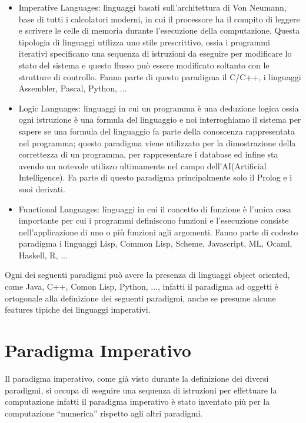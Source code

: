 \documentclass[a4paper]{report}
\begin{document}
\begin{itemize}
\item Imperative Languages: linguaggi basati sull'architettura di Von Neumann, base di tutti i calcolatori moderni,
      in cui il processore ha il compito di leggere e scrivere le celle di memoria durante l'esecuzione della computazione.\newline
      Questa tipologia di linguaggi utilizza uno stile prescrittivo, ossia i programmi iterativi specificano una sequenza
      di istruzioni da eseguire per modificare lo stato del sistema e questo flusso può essere modificato soltanto con
      le strutture di controllo.
      Fanno parte di questo paradigma il C/C++, i linguaggi Assembler, Pascal, Python, ...
\item Logic Languages: linguaggi in cui un programma è una deduzione logica ossia ogni istruzione è una formula del linguaggio
      e noi interroghiamo il sistema per sapere se una formula del linguaggio fa parte della conoscenza rappresentata nel programma;
      questo paradigma viene utilizzato per la dimostrazione della correttezza di un programma, per rappresentare i database
      ed infine sta avendo un notevole utilizzo ultimamente nel campo dell'AI(Artificial Intelligence).
      Fa parte di questo paradigma principalmente solo il Prolog e i suoi derivati.
\item Functional Languages: linguaggi in cui il concetto di funzione è l'unica cosa importante per cui i programmi definiscono
      funzioni e l'esecuzione consiste nell'applicazione di uno o più funzioni agli argomenti.
      Fanno parte di codesto paradigma i linguaggi Lisp, Common Lisp, Scheme, Javascript, ML, Ocaml, Haskell, R, ...
\end{itemize}
Ogni dei seguenti paradigmi può avere la presenza di linguaggi object oriented, come Java, C++, Comon Lisp, Python, ...,
infatti il paradigma ad oggetti è ortogonale alla definizione dei seguenti paradigmi, anche se presume alcune features tipiche
dei linguaggi imperativi.

\section{Paradigma Imperativo}
Il paradigma imperativo, come già visto durante la definizione dei diversi paradigmi, si occupa di eseguire una sequenza di istruzioni
per effettuare la computazione infatti il paradigma imperativo è stato inventato più per la computazione ``numerica'' rispetto agli
altri paradigmi.
\end{document}
